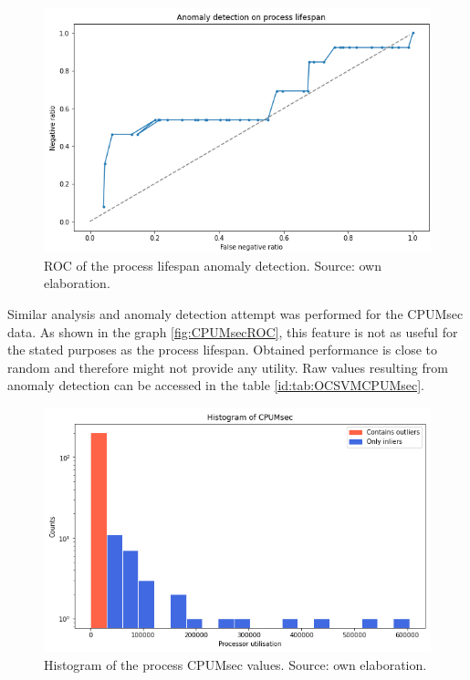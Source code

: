 \documentclass[a4paper,twoside,12pt]{book}
\begin{document}
\begin{figure}
	\centering
	\includegraphics[scale=0.9]{images/ROClifespan}
	\caption{ROC of the process lifespan anomaly detection. Source: own elaboration.}
	\label{fig:lifespanROC}
 \end{figure}

 Similar analysis and anomaly detection attempt was performed for the CPUMsec data. As shown in the graph \ref{fig:CPUMsecROC}, this 
 feature is not as useful for the stated purposes as the process lifespan. Obtained performance is close to random and therefore might
 not provide any utility. Raw values resulting from anomaly detection can be accessed in the table \ref{id:tab:OCSVMCPUMsec}.

 \begin{figure}
	\centering
	\includegraphics[scale=0.9]{images/CPUMsecHist}
	\caption{Histogram of the process CPUMsec values. Source: own elaboration.}
	\label{fig:cpumsecHist}
 \end{figure}
 
\end{document}
